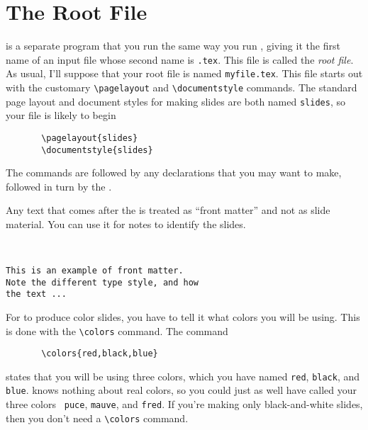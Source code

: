 \section{The Root File}

\SLITEX{} is a separate program that you run the same way you run
\LATEX{}, giving it the first name of an input file whose second name
is \xsp{}\mbox{\tt .tex}\Xsp.  This file is called the {\it root
 file}.  As usual, I'll suppose that your root file
is named \xsp{}\mbox{\tt myfile.tex}\Xsp.  This file
starts out with the customary
\xsp\hbox{\verb"\pagelayout"}\xsp{}
and \linebreak %
\xsp{}\hbox{\verb"\documentstyle"}\xsp{}
commands.  The standard page layout and document styles for making
slides are both named \xsp{}\mbox{\tt slides}\Xsp, so your file is likely to begin
\begin{verbatim}
       \pagelayout{slides}
       \documentstyle{slides}
\end{verbatim}
The commands are followed by any declarations that you may want to
make, followed in turn by the \xsp{}\hbox{\verb""}\Xsp.

Any text that comes after the \xsp{}\hbox{\verb""}\xsp{}
is treated as
``front  matter''
and not as slide material.  You can use it for notes to
identify the slides.
\begin{exambox}
\midbox
\begin{verbatim}


This is an example of front matter.
Note the different type style, and how
the text ...
\end{verbatim}
\end{exambox}

For \SLITEX{} to produce color slides, you have to tell it what colors
you will be using.  This is done with the
\xsp{}\hbox{\verb"\colors"}\xsp{} command.  The command
\begin{verbatim}
       \colors{red,black,blue}
\end{verbatim}
states that you will be using three colors, which you have named
\xsp{}\mbox{\tt red}\Xsp, \xsp{}\mbox{\tt black}\Xsp, and
\xsp{}\mbox{\tt blue}\Xsp.  \SLITEX{} knows nothing about real colors,
so you could just as well have called your three colors \mbox{\tt
puce}, \mbox{\tt mauve}, and \mbox{\tt fred}.  If you're making only
black-and-white slides, then you don't need a
\xsp{}\hbox{\verb"\colors"}\xsp{} command.

